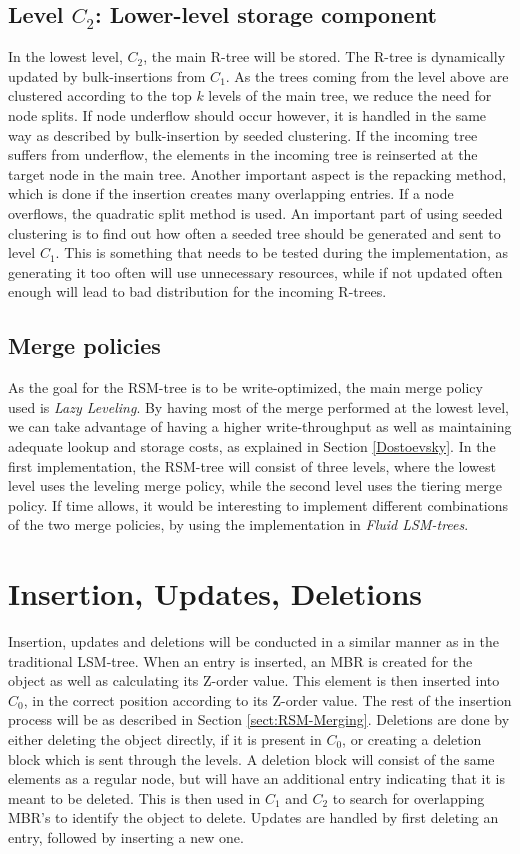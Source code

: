 \subsection{Level $C_2$: Lower-level storage component}
In the lowest level, $C_2$, the main R-tree will be stored. The R-tree is dynamically updated by bulk-insertions from $C_1$. As the trees coming from the level above are clustered according to the top $k$ levels of the main tree, we reduce the need for node splits. If node underflow should occur however, it is handled in the same way as described by bulk-insertion by seeded clustering\cite{SeededClustering}. If the incoming tree suffers from underflow, the elements in the incoming tree is reinserted at the target node in the main tree. Another important aspect is the repacking method, which is done if the insertion creates many overlapping entries. If a node overflows, the quadratic split method\cite{r-tree} is used. An important part of using seeded clustering is to find out how often a seeded tree should be generated and sent to level $C_1$. This is something that needs to be tested during the implementation, as generating it too often will use unnecessary resources, while if not updated often enough will lead to bad distribution for the incoming R-trees. 

\subsection{Merge policies}
As the goal for the RSM-tree is to be write-optimized, the main merge policy used is \emph{Lazy Leveling}\cite{Dostoevsky}. By having most of the merge performed at the lowest level, we can take advantage of having a higher write-throughput as well as maintaining adequate lookup and storage costs, as explained in Section \ref{Dostoevsky}. In the first implementation, the RSM-tree will consist of three levels, where the lowest level uses the leveling merge policy, while the second level uses the tiering merge policy. If time allows, it would be interesting to implement different combinations of the two merge policies, by using the implementation in \emph{Fluid LSM-trees}.  


\section{Insertion, Updates, Deletions}
Insertion, updates and deletions will be conducted in a similar manner as in the traditional LSM-tree. When an entry is inserted, an MBR is created for the object as well as calculating its Z-order value. This element is then inserted into $C_0$, in the correct position according to its Z-order value. The rest of the insertion process will be as described in Section \ref{sect:RSM-Merging}. Deletions are done by either deleting the object directly, if it is present in $C_0$, or creating a deletion block which is sent through the levels. A deletion block will consist of the same elements as a regular node, but will have an additional entry indicating that it is meant to be deleted. This is then used in $C_1$ and $C_2$ to search for overlapping MBR's to identify the object to delete. Updates are handled by first deleting an entry, followed by inserting a new one. 


